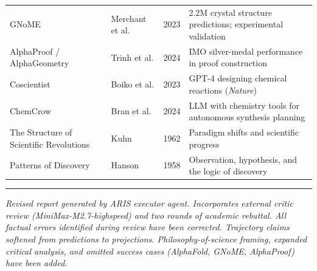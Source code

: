 \documentclass[11pt,a4paper]{article}
\begin{document}
\begin{longtable}{@{}p{4.2cm}p{3cm}p{1.2cm}p{5.5cm}@{}}
GNoME & Merchant et al. & 2023 & 2.2M crystal structure predictions; experimental validation \\
AlphaProof / AlphaGeometry & Trinh et al. & 2024 & IMO silver-medal performance in proof construction \\
Coscientist & Boiko et al. & 2023 & GPT-4 designing chemical reactions (\textit{Nature}) \\
ChemCrow & Bran et al. & 2024 & LLM with chemistry tools for autonomous synthesis planning \\
The Structure of Scientific Revolutions & Kuhn & 1962 & Paradigm shifts and scientific progress \\
Patterns of Discovery & Hanson & 1958 & Observation, hypothesis, and the logic of discovery \\
\bottomrule
\end{longtable}

\vspace{2em}
\noindent\rule{\textwidth}{0.4pt}
\vspace{0.5em}

\noindent\small\textit{Revised report generated by ARIS executor agent. Incorporates external critic review (MiniMax-M2.7-highspeed) and two rounds of academic rebuttal. All factual errors identified during review have been corrected. Trajectory claims softened from predictions to projections. Philosophy-of-science framing, expanded critical analysis, and omitted success cases (AlphaFold, GNoME, AlphaProof) have been added.}
\end{document}
